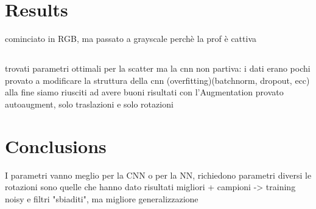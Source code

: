 \documentclass{report}
\begin{document}
\chapter{Results}
cominciato in RGB, ma passato a grayscale perchè la prof è cattiva
\section{}
trovati parametri ottimali per la scatter
ma la cnn non partiva: i dati erano pochi
provato a modificare la struttura della cnn (overfitting)(batchnorm, dropout, ecc)
alla fine siamo riusciti ad avere buoni risultati con l'Augmentation
provato autoaugment, solo traslazioni e solo rotazioni

\chapter{Conclusions}
I parametri vanno meglio per la CNN o per la NN, richiedono parametri diversi
le rotazioni sono quelle che hanno dato risultati migliori
+ campioni -> training noisy e filtri "sbiaditi", ma migliore generalizzazione
\end{document}
